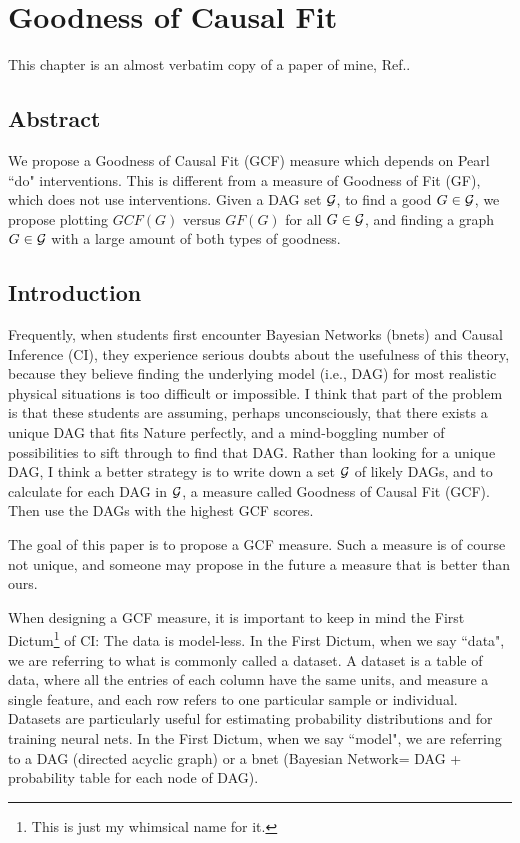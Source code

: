 \chapter{Goodness of Causal Fit}
\label{ch-good-causal-fit}
This chapter
is an almost verbatim 
copy of a paper of mine, Ref.\cite{tucci-gcf}.

\section{Abstract}
We propose a 
Goodness of Causal Fit (GCF) measure
which depends 
on Pearl ``do" interventions.
This is different
from a measure of Goodness of Fit (GF),
which does not use interventions.
Given a DAG set  ${\cal G}$,
to find a good $G\in {\cal G}$,
we propose plotting
$GCF(G)$ versus $GF(G)$
for all $G\in {\cal G}$,
and finding a 
graph $G\in {\cal G}$  with 
a large amount 
of both types of goodness.

\section{Introduction}



Frequently,
when students
first encounter
Bayesian Networks (bnets)
and Causal Inference (CI),
they experience serious doubts
about the usefulness of this
theory, because they believe
finding the underlying model 
(i.e., DAG)
for most realistic
 physical situations is
too difficult or impossible.
I think
that part of the problem
is that these students
are assuming, perhaps
unconsciously,
that there exists
a unique DAG
that fits Nature perfectly,
and a mind-boggling number
 of possibilities
to sift through to find that DAG.
Rather than looking
for a unique DAG,
I think a better strategy
is to write down
a set ${\cal G}$ 
of likely DAGs,
and to calculate for 
each DAG in ${\cal G}$,
 a measure called 
Goodness of Causal Fit (GCF).
Then use the DAGs with
the highest GCF scores.


The goal of this paper
is to propose a GCF measure.
Such a measure is of course
not unique,
and someone may propose 
in the future a measure that is better
than ours.

When designing a GCF measure,
it is important to keep
in mind the First Dictum\footnote{
This is just my whimsical name for it.} of CI: The data is model-less.
 In the First Dictum,
when we say ``data", we are referring to what is commonly
 called a dataset. A dataset is a table of data, where all
 the entries of each column have the same units, and 
measure a single feature, and each row refers to one
 particular sample or individual. Datasets are particularly 
useful for estimating probability distributions and for 
training neural nets. In the First Dictum, when we say ``model", we are 
referring to a DAG (directed acyclic graph) or a bnet
 (Bayesian Network= DAG + probability table 
for each node of DAG).

